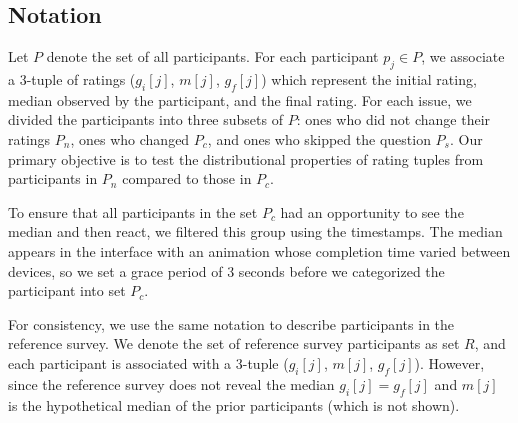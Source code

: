 \subsection{Notation}
Let $P$ denote the set of all participants.
For each participant $p_j\in P$, we associate a 3-tuple of ratings ($g_i[j]$, $m[j]$, $g_f[j]$) which represent the initial rating, median observed by the participant, and the final rating.
For each issue, we divided the participants into three subsets of $P$: ones who did not change their ratings $P_n$, ones who changed $P_c$, and ones who skipped the question $P_s$.
Our primary objective is to test the distributional properties of rating tuples from participants in $P_n$ compared to those in $P_c$.

To ensure that all participants in the set $P_c$ had an opportunity to see the median and then react, we filtered this group using the timestamps. 
The median appears in the interface with an animation whose completion time varied between devices, so we set a grace period of 3 seconds before 
we categorized the participant into set $P_c$.  

For consistency, we use the same notation to describe participants in the reference survey. We denote the set of reference survey participants as set $R$, and each participant is associated with a 3-tuple ($g_i[j]$, $m[j]$, $g_f[j]$). However, since the reference survey does not reveal the median $g_i[j] = g_f[j]$  and $m[j]$ is the hypothetical median of the prior participants (which is not shown).
